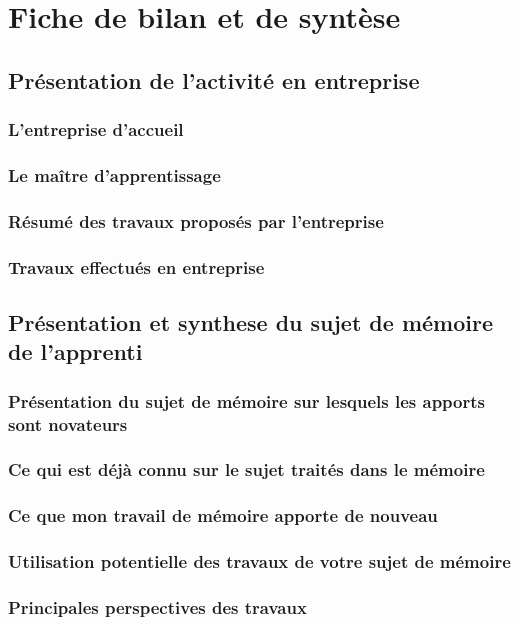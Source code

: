 \section{Fiche de bilan et de syntèse}

\subsection{Présentation de l'activité en entreprise}
\subsubsection{L'entreprise d'accueil}
\subsubsection{Le maître d'apprentissage}
\subsubsection{Résumé des travaux proposés par l'entreprise}
\subsubsection{Travaux effectués en entreprise}

\subsection{Présentation et synthese du sujet de mémoire de l'apprenti}
\subsubsection{Présentation du sujet de mémoire sur lesquels les apports sont novateurs}
\subsubsection{Ce qui est déjà connu sur le sujet traités dans le mémoire}
\subsubsection{Ce que mon travail de mémoire apporte de nouveau}
\subsubsection{Utilisation potentielle des travaux de votre sujet de mémoire}
\subsubsection{Principales perspectives des travaux}

